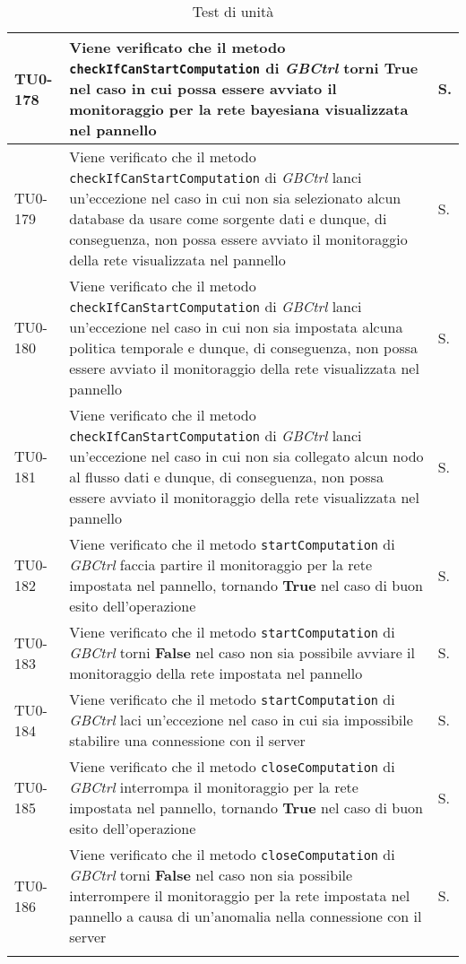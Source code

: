 \begin{longtable}{|C{.15\textwidth}|m{.66\textwidth}|C{.10\textwidth}|}
\hline
TU0-178 & Viene verificato che il metodo \texttt{checkIfCanStartComputation} di \textit{GBCtrl} torni \textbf{True} nel caso in cui possa essere avviato il monitoraggio per la rete bayesiana visualizzata nel pannello & S.\\
\hline
{}TU0-179 & Viene verificato che il metodo \texttt{checkIfCanStartComputation} di \textit{GBCtrl} lanci un'eccezione nel caso in cui non sia selezionato alcun database da usare come sorgente dati e dunque, di conseguenza, non possa essere avviato il monitoraggio della rete visualizzata nel pannello & S.\\
\hline
TU0-180 & Viene verificato che il metodo \texttt{checkIfCanStartComputation} di \textit{GBCtrl} lanci un'eccezione nel caso in cui non sia impostata alcuna politica temporale e dunque, di conseguenza, non possa essere avviato il monitoraggio della rete visualizzata nel pannello & S.\\
\hline
{}TU0-181 & Viene verificato che il metodo \texttt{checkIfCanStartComputation} di \textit{GBCtrl} lanci un'eccezione nel caso in cui non sia collegato alcun nodo al flusso dati e dunque, di conseguenza, non possa essere avviato il monitoraggio della rete visualizzata nel pannello & S.\\
\hline
TU0-182 & Viene verificato che il metodo \texttt{startComputation} di \textit{GBCtrl} faccia partire il monitoraggio per la rete impostata nel pannello, tornando \textbf{True} nel caso di buon esito dell'operazione & S.\\
\hline
{}TU0-183 & Viene verificato che il metodo \texttt{startComputation} di \textit{GBCtrl} torni \textbf{False} nel caso non sia possibile avviare il monitoraggio della rete impostata nel pannello & S.\\
\hline
TU0-184 & Viene verificato che il metodo \texttt{startComputation} di \textit{GBCtrl} laci un'eccezione nel caso in cui sia impossibile stabilire una connessione con il server & S.\\
\hline
{}TU0-185 & Viene verificato che il metodo \texttt{closeComputation} di \textit{GBCtrl} interrompa il monitoraggio per la rete impostata nel pannello, tornando \textbf{True} nel caso di buon esito dell'operazione & S.\\
\hline
TU0-186 & Viene verificato che il metodo \texttt{closeComputation} di \textit{GBCtrl} torni \textbf{False} nel caso non sia possibile interrompere il monitoraggio per la rete impostata nel pannello a causa di un'anomalia nella connessione con il server & S.\\
\hline


\hline
\caption{Test di unità}


\label{testunita}
\end{longtable}



